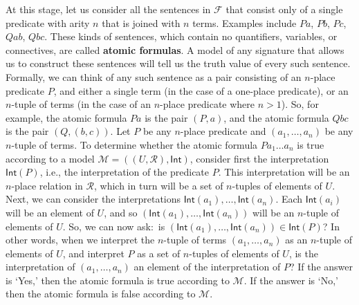 \documentclass[11pt]{article}
\theoremstyle{definition}
\theoremstyle{remark}
\begin{document}
At this stage, let us consider all the sentences in $\mathcal{F}$ that consist only of a single predicate with arity $n$ that is joined with $n$ terms. Examples include $Pa$, $Pb$, $Pc$, $Qab$, $Qbc$. These kinds of sentences, which contain no quantifiers, variables, or connectives, are called \textbf{atomic formulas}. A model of any signature that allows us to construct these sentences will tell us the truth value of every such sentence. Formally, we can think of any such sentence as a pair consisting of an $n$-place predicate $P$, and either a single term (in the case of a one-place predicate), or an $n$-tuple of terms (in the case of an $n$-place predicate where $n>1$). So, for example, the atomic formula $Pa$ is the pair $(P,a)$, and the atomic formula $Qbc$ is the pair $(Q,(b,c))$. Let $P$ be any $n$-place predicate and $(a_{1},\dots,a_{n})$ be any $n$-tuple of terms. To determine whether the atomic formula $Pa_{1}\dots a_{n}$ is true according to a model $\mathcal{M}=((U,\mathcal{R}),\textsf{Int})$, consider first the interpretation $\textsf{Int}(P)$, i.e., the interpretation of the predicate $P$. This interpretation will be an $n$-place relation in $\mathcal{R}$, which in turn will be a set of $n$-tuples of elements of $U$. Next, we can consider the interpretations $\textsf{Int}(a_{1}),\dots,\textsf{Int}(a_{n})$. Each $\textsf{Int}(a_{i})$ will be an element of $U$, and so $(\textsf{Int}(a_{1}),\dots,\textsf{Int}(a_{n}))$ will be an $n$-tuple of elements of $U$. So, we can now ask:\ is $(\textsf{Int}(a_{1}),\dots,\textsf{Int}(a_{n}))\in \textsf{Int}(P)$? In other words, when we interpret the $n$-tuple of terms $(a_{1},\dots,a_{n})$ as an $n$-tuple of elements of $U$, and interpret $P$ as a set of $n$-tuples of elements of $U$, is the interpretation of $(a_{1},\dots,a_{n})$ an element of the interpretation of $P$? If the answer is `Yes,' then the atomic formula is true according to $\mathcal{M}$. If the answer is `No,' then the atomic formula is false according to $\mathcal{M}$.\par 
\end{document}
